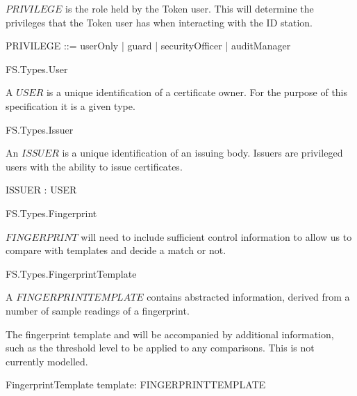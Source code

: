 $PRIVILEGE$ is the role held by the Token user. This will determine
the privileges that the Token user has when interacting with the ID
station.
\begin{zed}
        PRIVILEGE ::=  userOnly | guard | securityOfficer | auditManager 
\end{zed}

\begin{traceunit}{FS.Types.User}
\end{traceunit}


A $USER$ is a unique identification of a certificate owner. For the
purpose of this specification it is a given type. 
 
\begin{zed}
	[ USER ]
\end{zed}

\begin{traceunit}{FS.Types.Issuer}
\end{traceunit}


An $ISSUER$ is a unique identification of an issuing body. Issuers are
privileged users with the ability to issue certificates. 
 
\begin{axdef}
ISSUER : \power USER
\end{axdef}

\begin{traceunit}{FS.Types.Fingerprint}
\end{traceunit}


$FINGERPRINT$ will need to include sufficient control information to allow
us to compare with templates and decide a match or not.
\begin{zed}
	[ FINGERPRINT ]
\end{zed}

\begin{traceunit}{FS.Types.FingerprintTemplate}
\end{traceunit}


A $FINGERPRINTTEMPLATE$ contains abstracted information, derived from
a number of sample readings of a fingerprint.

\begin{zed}
	[ FINGERPRINTTEMPLATE ]
\end{zed}

The fingerprint template and will be accompanied by additional information,
such as the threshold level to be applied to any comparisons.
This is not currently modelled.
\begin{schema}{FingerprintTemplate}
	template: FINGERPRINTTEMPLATE
\end{schema}


